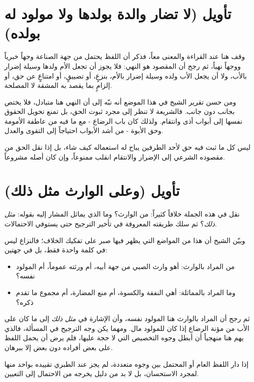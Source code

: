 \section{تأويل (لا تضار والدة بولدها ولا مولود له بولده)}
وقف  هنا عند القراءة والمعنى معاً، فذكر أن اللفظ يحتمل من جهة الصناعة وجهاً خبرياً ووجهاً نهياً، ثم رجح أن المقصود هو النهي: فلا يجوز أن تجعل الأم ولدها وسيلة إضرار بالأب، ولا أن يجعل الأب ولده وسيلة إضرار بالأم، بنزعٍ، أو تضييقٍ، أو امتناعٍ عن حق، أو إلزامٍ بما يقصد به المشقة لا المصلحة.

ومن حسن تقرير الشيخ في هذا الموضع أنه نبّه إلى أن النهي هنا متبادل، فلا يختص بجانب دون جانب. فالشريعة لا تنظر إلى مجرد ثبوت الحق، بل تمنع تحويل الحقوق نفسها إلى أبواب أذى وانتقام. ولذلك كان باب الرضاع - مع ما فيه من عاطفة الأمومة وحق الأبوة - من أشد الأبواب احتياجاً إلى التقوى والعدل.

\begin{fawaid}
ليس كل ما ثبت فيه حق لأحد الطرفين يباح له استعماله كيف شاء، بل إذا نقل الحق من مقصوده الشرعي إلى الإضرار والانتقام انقلب ممنوعاً، وإن كان أصله مشروعاً.
\end{fawaid}

\section{تأويل (وعلى الوارث مثل ذلك)}
نقل  في هذه الجملة خلافاً كثيراً: من الوارث؟ وما الذي يماثل المشار إليه بقوله: \textit{مثل ذلك}؟ ثم سلك طريقته المعروفة في تأخير الترجيح حتى يستوفي الاحتمالات.

وبيّن الشيخ أن هذا من المواضع التي يظهر فيها صبر  على تفكيك الخلاف؛ فالنزاع ليس في كلمة واحدة فقط، بل في جهتين:
\begin{itemize}
    \item من المراد بالوارث: أهو وارث الصبي من جهة أبيه، أم ورثته عموماً، أم المولود نفسه؟
    \item وما المراد بالمماثلة: أهي النفقة والكسوة، أم منع المضارة، أم مجموع ما تقدم ذكره؟
\end{itemize}

ثم رجح  أن المراد بالوارث هنا المولود نفسه، وأن الإشارة في \textit{مثل ذلك} إلى ما كان على الأب من مؤنة الرضاع إذا كان للمولود مال. ومهما يكن وجه الترجيح في المسألة، فالذي يهم هنا منهجياً أن  أبطل وجوه التخصيص التي لا حجة عليها، فلم يرض أن يحمل اللفظ على بعض أفراده دون بعض إلا ببرهان.

\begin{fawaid}
إذا دار اللفظ العام أو المحتمل بين وجوه متعددة، لم يجز عند الطبري تقييده بواحد منها لمجرد الاستحسان، بل لا بد من دليل يخرجه من الاحتمال إلى التعيين.
\end{fawaid}

